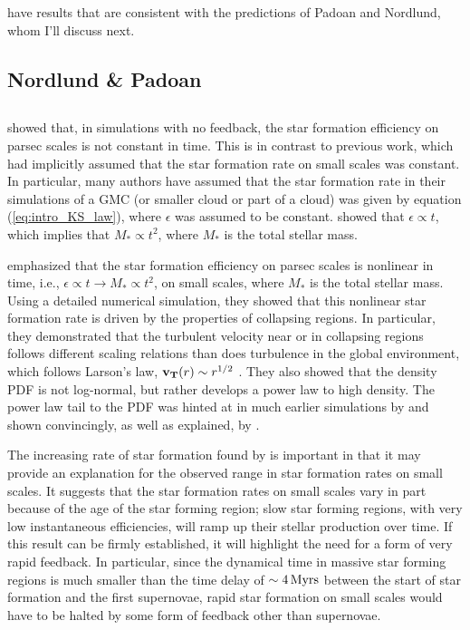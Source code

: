 \documentclass[../dissertation.tex]{subfiles}
\begin{document}
\citet{2004ApJ...605..800L} have results that are consistent with the predictions of Padoan and Nordlund, whom I'll discuss next.

\subsection{Nordlund \& Padoan}



\subsection{\citet{2015ApJ...800...49L}} \label{Lee15_model}

\citet{2015ApJ...800...49L} showed that, in simulations with no feedback, the star formation efficiency on
parsec scales is not constant in time.
This is in contrast to previous work, which had implicitly assumed that the star formation rate on small scales was constant.
In particular, many authors have assumed that the star formation rate in their simulations of a GMC (or smaller cloud or part of a cloud) was given by equation (\ref{eq:intro_KS_law}), where $\epsilon$ was assumed to be constant.
\citet{2015ApJ...800...49L} showed that $\epsilon \propto t$, which implies that $M_* \propto t^2$, where $M_*$ is the total stellar mass.

\citet{2015ApJ...800...49L} emphasized that the star formation efficiency on 
parsec scales is nonlinear 
in time, i.e., $\epsilon \propto t \rightarrow M_* \propto t^2$, on small scales, where $M_*$ is the total stellar mass. 
Using a detailed numerical simulation, they showed that this nonlinear star formation 
rate is driven by the properties of collapsing regions.
In particular, they demonstrated that the turbulent velocity near or in collapsing regions follows 
different scaling relations than does turbulence in the global environment, which follows
Larson's law, $\mathbf{v_T} (r)\sim r^{1/2}$ \citep{1981MNRAS.194..809L}. 
They also showed that the density PDF 
is not log-normal, but rather develops a power law to high density.
The power law tail to the  PDF  was hinted at in much earlier simulations by \citet{2000ApJ...535..869K} and shown convincingly, 
as well as explained, by \citet{2011ApJ...727L..20K}. 

The increasing rate of star formation found by \citet{2015ApJ...800...49L} is important 
in that it may provide an explanation for the observed range in star formation rates on 
small scales.  It suggests that the star formation rates on small scales 
vary in part because of the age of the star forming region; slow star forming 
regions, with very low instantaneous efficiencies, will ramp up their stellar production over time. If this result
can be firmly established, it will highlight the need for a form of very rapid 
feedback. In particular, since the dynamical time in massive star forming regions 
is much smaller than the time delay of $\sim 4{\,\rm Myrs}$ between the start of star 
formation and the first supernovae, rapid star formation on small scales would 
have to be halted by some form of feedback other than supernovae. 
\end{document}
